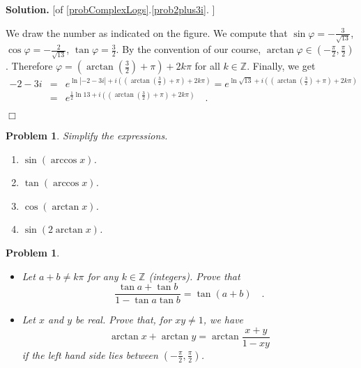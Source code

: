 \documentclass[12pt]{book}
\newenvironment{solution}{\medskip\noindent\textbf{Solution.} }{$\Box$}
\newtheorem{problem}[theorem]{Problem}
\begin{document}
\begin{solution}
[of \ref{probComplexLogs}.\ref{prob2plus3i}. ]

We draw the number as indicated on the figure. We compute that $\sin \varphi =-\frac{3}{\sqrt{13}}$, $\cos \varphi=-\frac{2}{\sqrt{13}}$, $\tan \varphi = \frac{3}{2}$. By the convention of our course, $\arctan \varphi\in (-\frac{\pi}{2}, \frac{\pi}{2})$. Therefore $\varphi= \left(\arctan\left(\frac{3}{2}\right) +\pi\right)+2k\pi $ for all $k\in \mathbb Z$. Finally, we get
\[
\begin{array}{rcl}
-2-3i&=& e^{\ln|-2-3i| + i\left(\left(\arctan\left(\frac{3}{2}\right) +\pi\right) +2k\pi\right)}= e^{\ln \sqrt{13}  + i\left(\left(\arctan\left(\frac{3}{2}\right) +\pi\right) +2k\pi\right)} \\&=&  e^{\frac{1}2\ln 13  + i\left(\left(\arctan\left(\frac{3}{2}\right) +\pi\right) +2k\pi\right)}\quad .
\end{array}
\]

\end{solution}
\begin{problem}
Simplify the expressions.
\begin{enumerate}
\item $\sin(\arccos x)$.
\item $\tan (\arccos x)$.
\item $\cos (\arctan x)$.
\item $\sin (2 \arctan x)$.
\end{enumerate}
\end{problem}
\begin{problem}
\begin{itemize}
\item Let $a+b\neq k\pi $ for any $k\in \mathbb Z$ (integers). Prove that
\[
\frac{\tan a + \tan b}{1-\tan a \tan b }= \tan (a+b)\quad .
\]
\item Let $x$ and $y$ be real. Prove that, for $xy\neq 1$, we have
\[\arctan x+\arctan y= \arctan \frac{x+y}{1-xy}
\]
if the left hand side lies between $(-\frac{\pi}{2}, \frac{\pi}{2})$.
\end{itemize}
\end{problem}
\end{document}
